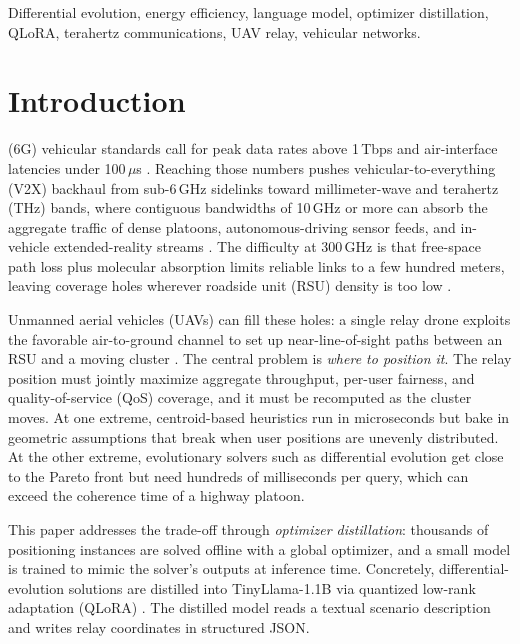 \documentclass[journal]{IEEEtran}
\begin{document}
\begin{IEEEkeywords}
Differential evolution, energy efficiency, language model, optimizer distillation, QLoRA, terahertz communications, UAV relay, vehicular networks.
\end{IEEEkeywords}


\section{Introduction}
\label{sec:introduction}

 (6G) vehicular standards call for peak data rates above 1\,Tbps and air-interface latencies under 100\,$\mu$s \cite{rappaport2019}. Reaching those numbers pushes vehicular-to-everything (V2X) backhaul from sub-6\,GHz sidelinks toward millimeter-wave and terahertz (THz) bands, where contiguous bandwidths of 10\,GHz or more can absorb the aggregate traffic of dense platoons, autonomous-driving sensor feeds, and in-vehicle extended-reality streams \cite{akyildiz2022, chaccour2022}. The difficulty at 300\,GHz is that free-space path loss plus molecular absorption limits reliable links to a few hundred meters, leaving coverage holes wherever roadside unit (RSU) density is too low \cite{sarieddeen2021}.

Unmanned aerial vehicles (UAVs) can fill these holes: a single relay drone exploits the favorable air-to-ground channel to set up near-line-of-sight paths between an RSU and a moving cluster \cite{zeng2016wireless}. The central problem is \emph{where to position it}. The relay position must jointly maximize aggregate throughput, per-user fairness, and quality-of-service (QoS) coverage, and it must be recomputed as the cluster moves. At one extreme, centroid-based heuristics \cite{zeng2016throughput} run in microseconds but bake in geometric assumptions that break when user positions are unevenly distributed. At the other extreme, evolutionary solvers such as differential evolution \cite{storn1997} get close to the Pareto front but need hundreds of milliseconds per query, which can exceed the coherence time of a highway platoon.

This paper addresses the trade-off through \emph{optimizer distillation}: thousands of positioning instances are solved offline with a global optimizer, and a small model is trained to mimic the solver's outputs at inference time. Concretely, differential-evolution solutions are distilled into TinyLlama-1.1B \cite{zhang2024tinyllama} via quantized low-rank adaptation (QLoRA) \cite{dettmers2023qlora}. The distilled model reads a textual scenario description and writes relay coordinates in structured JSON.
\end{document}
